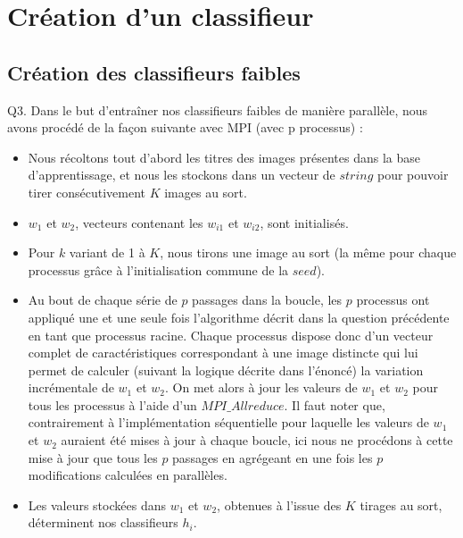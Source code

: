 \documentclass[a4paper,11pt]{article}
\begin{document}
\section{Création d'un classifieur}
\subsection{Création des classifieurs faibles}
Q3. Dans le but d’entraîner nos classifieurs faibles de manière parallèle, nous avons procédé de la façon suivante avec MPI (avec p processus) : \\

\begin{itemize}
	\item Nous récoltons tout d’abord les titres des images présentes dans la base d’apprentissage, et nous les stockons dans un vecteur de $string$ pour pouvoir tirer consécutivement $K$ images au sort. \\
	\item  $w_1$ et $w_2$, vecteurs contenant les $w_{i1}$ et $w_{i2}$, sont initialisés.\\
	\item  Pour $k$ variant de 1 à $K$, nous tirons une image au sort (la même pour chaque processus grâce à l’initialisation commune de la $seed$).\\
	\item  Au bout de chaque série de $p$ passages dans la boucle, les $p$ processus ont appliqué une et une seule fois l’algorithme décrit dans la question précédente en tant que processus racine. Chaque processus dispose donc d’un vecteur complet de caractéristiques correspondant à une image distincte qui lui permet de calculer (suivant la logique décrite dans l’énoncé) la variation incrémentale de $w_1$ et $w_2$. On met alors à jour les valeurs de $w_1$ et $w_2$ pour tous les processus à l’aide d’un $MPI\_Allreduce$. Il faut noter que, contrairement à l'implémentation séquentielle pour laquelle les valeurs de $w_1$ et $w_2$ auraient été mises à jour à chaque boucle, ici nous ne procédons à cette mise à jour que tous les $p$ passages en agrégeant en une fois les $p$ modifications calculées en parallèles. \\
	\item  Les valeurs stockées dans $w_1$ et $w_2$, obtenues à l’issue des $K$ tirages au sort, déterminent nos classifieurs $h_i$.\\
		
\end{itemize}
\end{document}
